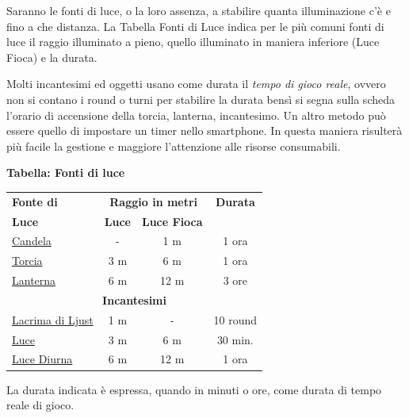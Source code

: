 \begin{multicols}{2}
Saranno le fonti di luce, o la loro assenza, a stabilire quanta illuminazione c'è e fino a che distanza. La Tabella Fonti di Luce indica per le più comuni fonti di luce il raggio illuminato a pieno, quello illuminato in maniera inferiore (Luce Fioca) e la durata.

Molti incantesimi ed oggetti usano come durata il \emph{tempo di gioco reale}, ovvero non si contano i round o turni per stabilire la durata bensì si segna sulla scheda l'orario di accensione della torcia, lanterna, incantesimo. Un altro metodo può essere quello di impostare un timer nello smartphone. In questa maniera risulterà più facile la gestione e maggiore l'attenzione alle risorse consumabili.

\medskip

\textbf{Tabella: Fonti di luce}\label{fontidiluce}

\medskip


\noindent\begin{tabular}{l|cc|c}
\textbf{Fonte di} &\multicolumn{2}{c}{\textbf{Raggio in metri}}& \textbf{Durata} \\
\textbf{Luce}& \textbf{Luce} & \textbf{Luce Fioca} &\\
\toprule
\hyperlink{Candela}{Candela} & - & 1 m & 1 ora\\
\hyperlink{Torcia}{Torcia} & 3 m & 6 m & 1 ora\\
\hyperlink{Lanterna}{Lanterna} & 6 m & 12 m & 3 ore \\
\multicolumn{4}{c}{\textbf{Incantesimi}}\\
\hyperlink{Lacrima di Ljust}{Lacrima di Ljust} & 1 m & - & 10 round\\
\hyperlink{Luce}{Luce}& 3 m & 6 m &30 min. \\
\hyperlink{Luce Diurna}{Luce Diurna} & 6 m & 12 m & 1 ora
\end{tabular}

\smallskip

La durata indicata è espressa, quando in minuti o ore, come durata di tempo reale di gioco.


\medskip


\end{multicols}
